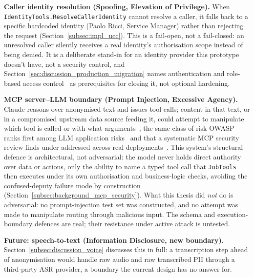 \textbf{Caller identity resolution (Spoofing, Elevation of Privilege).} When \texttt{IdentityTools.ResolveCallerIdentity} cannot resolve a caller, it falls back to a specific hardcoded identity (Paolo Ricci, Service Manager) rather than rejecting the request (Section~\ref{subsec:impl_ucc}). This is a fail-open, not a fail-closed: an unresolved caller silently receives a real identity's authorisation scope instead of being denied. It is a deliberate stand-in for an identity provider this prototype doesn't have, not a security control, and Section~\ref{sec:discussion_production_migration} names authentication and role-based access control~\cite{sandhu1996rbac} as prerequisites for closing it, not optional hardening.

\textbf{MCP server--LLM boundary (Prompt Injection, Excessive Agency).} Claude reasons over anonymised text and issues tool calls; content in that text, or in a compromised upstream data source feeding it, could attempt to manipulate which tool is called or with what arguments~\cite{greshake2023not}, the same class of risk OWASP ranks first among LLM application risks~\cite{owasp2025llmtop10} and that a systematic MCP security review finds under-addressed across real deployments~\cite{hou2025mcpsecurity}. This system's structural defence is architectural, not adversarial: the model never holds direct authority over data or actions, only the ability to name a typed tool call that \texttt{JobTools} then executes under its own authorisation and business-logic checks, avoiding the confused-deputy failure mode by construction~\cite{hardy1988confuseddeputy} (Section~\ref{subsec:background_mcp_security}). What this thesis did \emph{not} do is adversarial: no prompt-injection test set was constructed, and no attempt was made to manipulate routing through malicious input. The schema and execution-boundary defences are real; their resistance under active attack is untested.

\textbf{Future: speech-to-text (Information Disclosure, new boundary).} Section~\ref{subsec:discussion_voice} discusses this in full: a transcription step ahead of anonymisation would handle raw audio and raw transcribed PII through a third-party ASR provider, a boundary the current design has no answer for.

